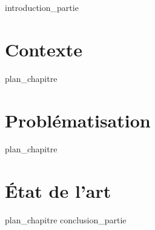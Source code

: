\label{part:01_int}
{introduction_partie}
%
\chapter{Contexte}
\label{chap:1}
{plan_chapitre}
%
\chapter{Problématisation}
\label{chap:2}
{plan_chapitre}
%
\chapter{État de l'art}
\label{chap:3}
{plan_chapitre}
%
\label{part:01_cnc}
{conclusion_partie}
